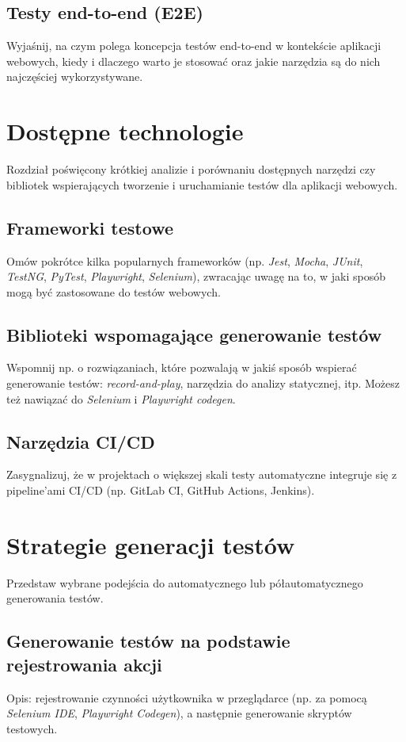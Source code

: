 \documentclass[12pt]{report}
\begin{document}
\section{Testy end-to-end (E2E)}
{Wyjaśnij, na czym polega koncepcja testów end-to-end w kontekście aplikacji webowych, kiedy i dlaczego warto je stosować oraz jakie narzędzia są do nich najczęściej wykorzystywane.}

\chapter{Dostępne technologie}
{Rozdział poświęcony krótkiej analizie i porównaniu dostępnych narzędzi czy bibliotek wspierających tworzenie i uruchamianie testów dla aplikacji webowych.}

\section{Frameworki testowe}
{Omów pokrótce kilka popularnych frameworków (np. \emph{Jest}, \emph{Mocha}, \emph{JUnit}, \emph{TestNG}, \emph{PyTest}, \emph{Playwright}, \emph{Selenium}), zwracając uwagę na to, w jaki sposób mogą być zastosowane do testów webowych.}

\section{Biblioteki wspomagające generowanie testów}
{Wspomnij np. o rozwiązaniach, które pozwalają w jakiś sposób wspierać generowanie testów: \emph{record-and-play}, narzędzia do analizy statycznej, itp. Możesz też nawiązać do \emph{Selenium} i \emph{Playwright codegen}.}

\section{Narzędzia CI/CD}
{Zasygnalizuj, że w projektach o większej skali testy automatyczne integruje się z pipeline’ami CI/CD (np. GitLab CI, GitHub Actions, Jenkins).}

\chapter{Strategie generacji testów}
{Przedstaw wybrane podejścia do automatycznego lub półautomatycznego generowania testów.}

\section{Generowanie testów na podstawie rejestrowania akcji}
{Opis: rejestrowanie czynności użytkownika w przeglądarce (np. za pomocą \emph{Selenium IDE}, \emph{Playwright Codegen}), a następnie generowanie skryptów testowych.}
\end{document}
